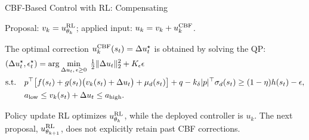 \documentclass[aspectratio=169,10pt]{beamer}
\begin{document}
\begin{frame}{CBF-Based Control with RL: Compensating}
\small
\setlength{\abovedisplayskip}{6pt}
\setlength{\belowdisplayskip}{6pt}
{\centering
{}\par}
\vspace{.4em}
Proposal: $v_k=u^{\rm RL}_{\theta_k}$; applied input: $u_k=v_k+u_k^{\rm CBF}$.
\par The optimal correction $u_k^{\rm CBF}(s_t)=\Delta u_t^\star$ is obtained by solving the QP:
\begin{equation}
\begin{aligned}
&(\Delta u_t^\star,\epsilon_t^\star)=\arg\min_{\Delta u_t,\,\epsilon\ge0}\;\tfrac12\|\Delta u_t\|_2^2+K_\epsilon\epsilon\\[.1em]
&\text{s.t.}\quad p^\top\!\left[f(s_t)+g(s_t)\big(v_k(s_t)+\Delta u_t\big)+\mu_d(s_t)\right]+q-k_\delta|p|^\top\sigma_d(s_t)\ge(1-\eta)h(s_t)-\epsilon,\\[.1em]
&\phantom{\text{s.t.}\quad}a_{\rm low}\le v_k(s_t)+\Delta u_t\le a_{\rm high}.
\end{aligned}
\end{equation}
\begin{block}{Policy update}
\small
RL optimizes $u^{\rm RL}_{\theta_k}$, while the deployed controller is $u_k$.
The next proposal, $u^{\rm RL}_{\theta_{k+1}}$, does not explicitly retain past CBF corrections.
\end{block}
\end{frame}
\end{document}
